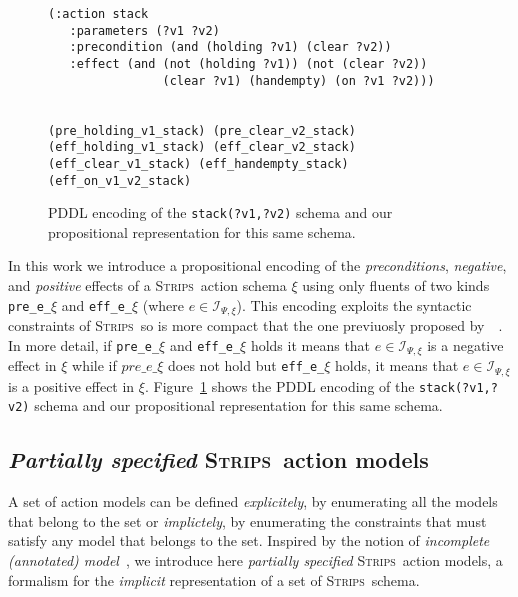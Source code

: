\documentclass{article}
\newcommand{\strips}{\textsc{Strips}}
\begin{document}
\begin{figure}
  \begin{tiny}  
  \begin{verbatim}
(:action stack
   :parameters (?v1 ?v2)
   :precondition (and (holding ?v1) (clear ?v2))
   :effect (and (not (holding ?v1)) (not (clear ?v2))
                (clear ?v1) (handempty) (on ?v1 ?v2)))


(pre_holding_v1_stack) (pre_clear_v2_stack)
(eff_holding_v1_stack) (eff_clear_v2_stack)
(eff_clear_v1_stack) (eff_handempty_stack) (eff_on_v1_v2_stack)
  \end{verbatim}           
  \end{tiny}  
 \caption{\small PDDL encoding of the {\tt\small stack(?v1,?v2)} schema and our propositional representation for this same schema.}
\label{fig:propositional}
\end{figure}

In this work we introduce a propositional encoding of the {\em preconditions}, {\em negative}, and {\em positive} effects of a \strips\ action schema $\xi$ using only fluents of two kinds {\tt\small pre\_e\_$\xi$} and {\tt\small eff\_e\_$\xi$} (where $e\in{\mathcal I}_{\Psi,\xi}$). This encoding exploits the syntactic constraints of \strips\ so is more compact that the one previuosly proposed by~\citeauthor{aineto2018learning}~\citeyear{aineto2018learning}. In more detail, if {\tt\small pre\_e\_$\xi$} and {\tt\small eff\_e\_$\xi$} holds it means that $e\in{\mathcal I}_{\Psi,\xi}$ is a negative effect in $\xi$ while if $pre\_e\_\xi$ does not hold but {\tt\small eff\_e\_$\xi$} holds, it means that $e\in{\mathcal I}_{\Psi,\xi}$ is a positive effect in $\xi$. Figure~\ref{fig:propositional} shows the PDDL encoding of the {\tt\small stack(?v1,?v2)} schema and our propositional representation for this same schema. 

\subsection{{\em Partially specified} \strips\ action models}
A set of action models can be defined {\em explicitely}, by enumerating all the models that belong to the set or {\em implictely}, by enumerating the constraints that must satisfy any model that belongs to the set. Inspired by the notion of {\em incomplete (annotated) model}~\cite{sreedharan2018handling}, we introduce here {\em partially specified} \strips\ action models, a formalism for the {\em implicit} representation of a set of \strips\ schema.
\end{document}
